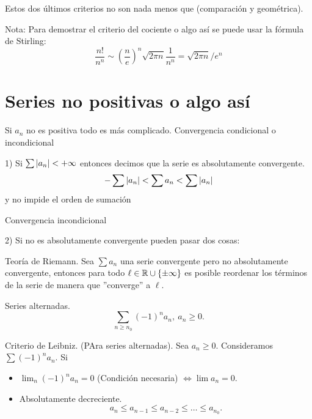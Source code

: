 {Estos dos últimos criterios no son nada menos que (comparación y geométrica).

Nota: Para demostrar el criterio del cociente o algo así se puede usar la fórmula de Stirling:
\begin{equation}
    \frac{n!}{n^n}\sim \left( \frac{n}{e} \right)^n \sqrt{2\pi n}\frac{1}{n^n} = \sqrt{2\pi n}/e^n
\end{equation}

\section{Series no positivas o algo así}
Si $a_n$ no es positiva todo es más complicado. Convergencia condicional o incondicional

1) Si $\sum\left\vert a_n \right\vert < +\infty$ entonces decimos que la serie es absolutamente convergente.
\begin{equation}
    -\sum\left\vert a_n \right\vert < \sum a_n < \sum \left\vert a_n \right\vert
\end{equation}
y no impide el orden de sumación

Convergencia incondicional

2) Si no es absolutamente convergente pueden pasar dos cosas:

\begin{theorem}
    Teoría de Riemann. Sea $\sum a_n$ una serie convergente pero no absolutamente convergente, entonces
    para todo $\ell\in\mathbb{R}\cup \{\pm \infty\} $ es posible reordenar los términos de la serie de manera que ''converge'' a $\ell$.
\end{theorem}

\begin{defi}
    Series alternadas.
    \begin{equation}
        \sum_{n\geq n_0} \left( -1 \right) ^n a_n,\ a_n \geq 0.
    \end{equation}
\end{defi}

\begin{theorem}
    Criterio de Leibniz. (PAra series alternadas). Sea $a_n \geq 0$. Consideramos $\sum \left( -1 \right) ^n a_n$. Si
    \begin{itemize}
        \item $\lim_{n}\left( -1 \right) ^n a_n = 0$ (Condición necesaria) $\iff \lim a_n = 0$.
    \item Absolutamente decreciente.
        \begin{equation}
            a_n \leq a_{n - 1} \leq a_{n - 2} \leq \ldots \leq a_{n_0}.
        \end{equation}
    \end{itemize}
\end{theorem}
}

